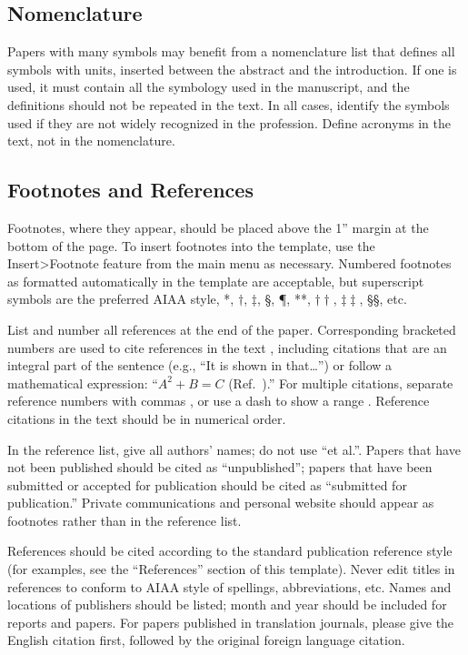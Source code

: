 \documentclass[conf]{new-aiaa}
\begin{document}
\subsection{Nomenclature}
Papers with many symbols may benefit from a nomenclature list that defines all symbols with units, inserted between the abstract and the introduction. If one is used, it must contain all the symbology used in the manuscript, and the definitions should not be repeated in the text. In all cases, identify the symbols used if they are not widely recognized in the profession. Define acronyms in the text, not in the nomenclature.

\subsection{Footnotes and References}
Footnotes, where they appear, should be placed above the 1'' margin at the bottom of the page. To insert footnotes into the template, use the Insert>Footnote feature from the main menu as necessary. Numbered footnotes as formatted automatically in the template are acceptable, but superscript  symbols are the preferred AIAA style, *, $\dag$, $\ddag$, \S, \P, **, $\dag\dag$, $\ddag\ddag$, \S\S, etc.

List and number all references at the end of the paper. Corresponding bracketed numbers are used to cite references in the text \cite{vatistas1986reverse}, including citations that are an integral part of the sentence (e.g., ``It is shown in \cite{dornheim1996planetary} that\ldots '') or follow a mathematical expression: ``$A^{2} + B = C$ (Ref.~\cite{terster1997nasa}).'' For multiple citations, separate reference numbers with commas \cite{peyret2012computational,oates1997aerothermodynamics}, or use a dash to show a range \cite{volpe1994techniques,thompsonspacecraft,chi1993fluid,brandis2016nonequi}. Reference citations in the text should be in numerical order.

In the reference list, give all authors' names; do not use ``et al.''. Papers that have not been published should be cited as ``unpublished''; papers that have been submitted or accepted for publication should be cited as ``submitted for publication.'' Private communications and personal website should appear as footnotes rather than in the reference list.

References should be cited according to the standard publication reference style (for examples, see the ``References'' section of this template). Never edit titles in references to conform to AIAA style of spellings, abbreviations, etc. Names and locations of publishers should be listed; month and year should be included for reports and papers. For papers published in translation journals, please give the English citation first, followed by the original foreign language citation.
\end{document}
